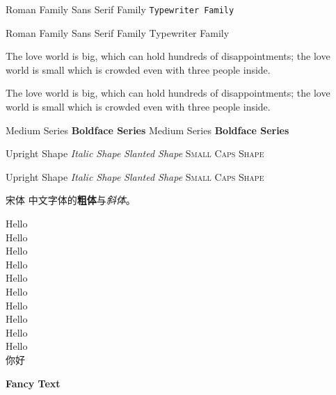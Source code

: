\documentclass[10pt]{article}
\newcommand{\myfont}{\textbf{\textsf{Fancy Text}}}
\begin{document}

	\textrm{Roman Family} \textsf{Sans Serif Family} \texttt{Typewriter Family}
	
	\rmfamily Roman Family {\sffamily Sans Serif Family} {\ttfamily Typewriter Family}
	
	\sffamily The love world is big, which can hold hundreds of disappointments; the love world is small which is crowded even with three people inside.
	
	\ttfamily The love world is big, which can hold hundreds of disappointments; the love world is small which is crowded even with three people inside.
	
	\textmd{Medium Series} \textbf{Boldface Series}
	{\mdseries Medium Series} {\bfseries Boldface Series}
	
	\textup{Upright Shape} \textit{Italic Shape}
	\textsl{Slanted Shape} \textsc{Small Caps Shape}
	
	{\upshape Upright Shape} {\itshape Italic Shape} {\slshape Slanted Shape} {\scshape Small Caps Shape}
	
	{\songti 宋体}   
	中文字体的\textbf{粗体}与\textit{斜体}。
	
	{\tiny Hello}\\
	{\scriptsize Hello}\\
	{\footnotesize Hello}\\
	{\small Hello}\\
	{\normalsize Hello}\\
	{\large Hello}\\
	{\Large Hello}\\
	{\LARGE Hello}\\
	{\huge Hello}\\
	{\Huge Hello}\\
	
	 你好
	
	\myfont
\end{document}
